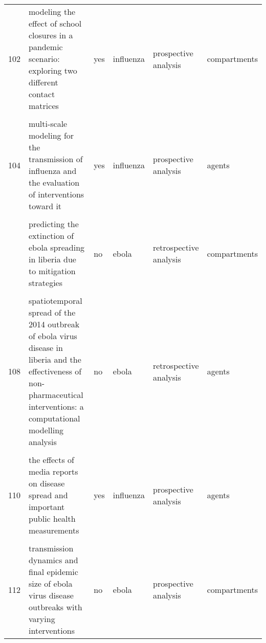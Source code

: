 \documentclass[
]{article}
\begin{document}
\begin{landscape}
\begin{longtable}{l>{\raggedright\arraybackslash}p{3.3cm}l>{\raggedright\arraybackslash}p{3.3cm}>{\raggedright\arraybackslash}p{2cm}l}
102 & modeling the effect of school closures in a pandemic scenario: exploring two different contact matrices & yes & influenza & prospective analysis & compartments\\
\cellcolor{gray!6}{103} & \cellcolor{gray!6}{modelling the effect of early detection of ebola} & \cellcolor{gray!6}{no} & \cellcolor{gray!6}{ebola} & \cellcolor{gray!6}{prospective analysis} & \cellcolor{gray!6}{compartments}\\
104 & multi-scale modeling for the transmission of influenza and the evaluation of interventions toward it & yes & influenza & prospective analysis & agents\\
\cellcolor{gray!6}{105} & \cellcolor{gray!6}{optimal intervention strategies for a seir control model of ebola epidemics} & \cellcolor{gray!6}{not applicable} & \cellcolor{gray!6}{ebola} & \cellcolor{gray!6}{prospective analysis} & \cellcolor{gray!6}{compartments}\\
\addlinespace
106 & predicting the extinction of ebola spreading in liberia due to mitigation strategies & no & ebola & retrospective analysis & compartments\\
\cellcolor{gray!6}{107} & \cellcolor{gray!6}{school closure strategies for the 2009 hong kong hini influenza pandemic} & \cellcolor{gray!6}{yes} & \cellcolor{gray!6}{influenza} & \cellcolor{gray!6}{prospective analysis} & \cellcolor{gray!6}{agents}\\
108 & spatiotemporal spread of the 2014 outbreak of ebola virus disease in liberia and the effectiveness of non-pharmaceutical interventions: a computational modelling analysis & no & ebola & retrospective analysis & agents\\
\cellcolor{gray!6}{109} & \cellcolor{gray!6}{strategies for early vaccination during novel influenza outbreaks} & \cellcolor{gray!6}{yes} & \cellcolor{gray!6}{influenza} & \cellcolor{gray!6}{prospective analysis} & \cellcolor{gray!6}{agents}\\
110 & the effects of media reports on disease spread and important public health measurements & yes & influenza & prospective analysis & agents\\
\addlinespace
\cellcolor{gray!6}{111} & \cellcolor{gray!6}{the impact of human behavioral changes in 2014 west africa ebola outbreak} & \cellcolor{gray!6}{no} & \cellcolor{gray!6}{ebola} & \cellcolor{gray!6}{retrospective analysis} & \cellcolor{gray!6}{compartments}\\
112 & transmission dynamics and final epidemic size of ebola virus disease outbreaks with varying interventions & no & ebola & prospective analysis & compartments\\

\end{longtable}
\end{landscape}
\end{document}
